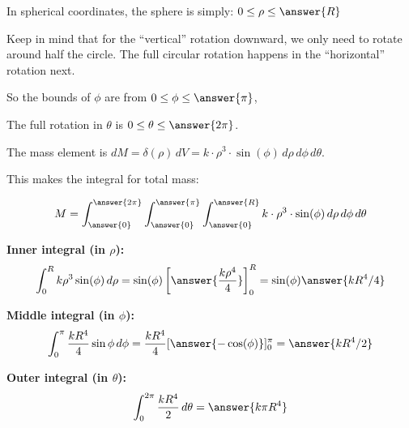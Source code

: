\documentclass{ximera}
\begin{document}
\begin{problem}
\begin{center}
\end{center}


In spherical coordinates, the sphere is simply: $0 \leq \rho \leq \answer{R}$

Keep in mind that for the ``vertical'' rotation downward, we only need to rotate around half the circle. The full circular rotation happens in the ``horizontal'' rotation next. 

So the bounds of $\phi$ are from $0 \leq \phi \leq \answer{\pi}$, 

The full rotation in $\theta$ is $0 \leq \theta \leq \answer{2\pi}$.

The mass element is $dM = \delta(\rho)\,dV = k\cdot \rho^3 \cdot \sin(\phi)\,d\rho\,d\phi\,d\theta$.

This makes the integral for total mass:

$$M = \int_{\answer{0}}^{\answer{2\pi}}\int_{\answer{0}}^{\answer{\pi}}\int_{\answer{0}}^{\answer{R}} k\cdot \rho^3\cdot \sin(\phi)\,d\rho\,d\phi\,d\theta$$

\textbf{Inner integral (in $\rho$):}
$$\int_0^R k\rho^3\sin(\phi)\,d\rho = \sin(\phi)\left[\answer{\frac{k\rho^4}{4}}\right]_0^R = \sin(\phi)\answer{k R^4/4}$$

\textbf{Middle integral (in $\phi$):}
$$\int_0^{\pi} \frac{kR^4}{4}\sin\phi\,d\phi = \frac{kR^4}{4}[\answer{-\cos(\phi)}]_0^{\pi}= \answer{kR^4/2}$$

\textbf{Outer integral (in $\theta$):}
$$\int_0^{2\pi} \frac{kR^4}{2}\,d\theta = \answer{k\pi R^4}$$

\end{problem}
\end{document}
